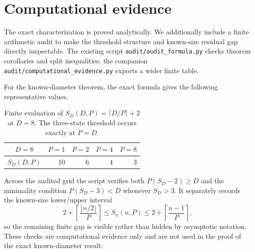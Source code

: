 \section{Computational evidence}\label{sec:computational-evidence}

The exact characterization is proved analytically.  We additionally include a finite arithmetic audit to make the threshold structure and known-size residual gap directly inspectable.  The existing script \texttt{audit/audit\_formula.py} checks theorem corollaries and split inequalities; the companion \texttt{audit/computational\_evidence.py} exports a wider finite table.

For the known-diameter theorem, the exact formula gives the following representative values.

\begin{table}[ht]
\centering
\begin{tabular}{c|rrrr}
$D=8$ & $P=1$ & $P=2$ & $P=4$ & $P=8$ \\
\hline
$S_D(D,P)$ & 10 & 6 & 4 & 3
\end{tabular}
\caption{Finite evaluation of $S_D(D,P)=\lceil D/P\rceil+2$ at $D=8$.  The three-state threshold occurs exactly at $P=D$.}
\label{tab:two-orbit-finite}
\end{table}

Across the audited grid the script verifies both $P(S_D-2)\ge D$ and the minimality condition $P(S_D-3)<D$ whenever $S_D>3$.  It separately records the known-size lower/upper interval
\[
2+\left\lceil\frac{\lfloor n/2\rfloor}{P}\right\rceil
\le S_n(n,P)\le
2+\left\lceil\frac{n-1}{P}\right\rceil,
\]
so the remaining finite gap is visible rather than hidden by asymptotic notation.  These checks are computational evidence only and are not used in the proof of the exact known-diameter result.
